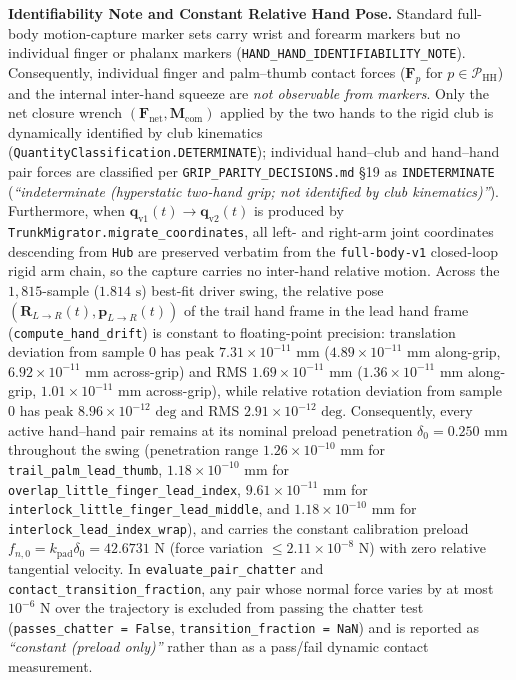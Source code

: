 \documentclass[11pt,a4paper]{article}
\begin{document}
\textbf{Identifiability Note and Constant Relative Hand Pose.} Standard full-body motion-capture marker sets carry wrist and forearm markers but no individual finger or phalanx markers (\texttt{HAND\_HAND\_IDENTIFIABILITY\_NOTE}). Consequently, individual finger and palm--thumb contact forces ($\mathbf{F}_p$ for $p \in \mathcal{P}_{\mathrm{HH}}$) and the internal inter-hand squeeze are \emph{not observable from markers}. Only the net closure wrench $(\mathbf{F}_{\mathrm{net}}, \mathbf{M}_{\mathrm{com}})$ applied by the two hands to the rigid club is dynamically identified by club kinematics (\texttt{QuantityClassification.DETERMINATE}); individual hand--club and hand--hand pair forces are classified per \texttt{GRIP\_PARITY\_DECISIONS.md} \S 19 as \texttt{INDETERMINATE} (\emph{``indeterminate (hyperstatic two-hand grip; not identified by club kinematics)''}). Furthermore, when $\mathbf{q}_{\mathrm{v1}}(t) \to \mathbf{q}_{\mathrm{v2}}(t)$ is produced by \texttt{TrunkMigrator.migrate\_coordinates}, all left- and right-arm joint coordinates descending from \texttt{Hub} are preserved verbatim from the \texttt{full-body-v1} closed-loop rigid arm chain, so the capture carries no inter-hand relative motion. Across the $1{,}815$-sample ($1.814\text{ s}$) best-fit driver swing, the relative pose $(\mathbf{R}_{L\to R}(t), \mathbf{p}_{L\to R}(t))$ of the trail hand frame in the lead hand frame (\texttt{compute\_hand\_drift}) is constant to floating-point precision: translation deviation from sample $0$ has peak $7.31 \times 10^{-11}\text{ mm}$ ($4.89 \times 10^{-11}\text{ mm}$ along-grip, $6.92 \times 10^{-11}\text{ mm}$ across-grip) and RMS $1.69 \times 10^{-11}\text{ mm}$ ($1.36 \times 10^{-11}\text{ mm}$ along-grip, $1.01 \times 10^{-11}\text{ mm}$ across-grip), while relative rotation deviation from sample $0$ has peak $8.96 \times 10^{-12}\text{ deg}$ and RMS $2.91 \times 10^{-12}\text{ deg}$. Consequently, every active hand--hand pair remains at its nominal preload penetration $\delta_0 = 0.250\text{ mm}$ throughout the swing (penetration range $1.26 \times 10^{-10}\text{ mm}$ for \texttt{trail\_palm\_lead\_thumb}, $1.18 \times 10^{-10}\text{ mm}$ for \texttt{overlap\_little\_finger\_lead\_index}, $9.61 \times 10^{-11}\text{ mm}$ for \texttt{interlock\_little\_finger\_lead\_middle}, and $1.18 \times 10^{-10}\text{ mm}$ for \texttt{interlock\_lead\_index\_wrap}), and carries the constant calibration preload $f_{n,0} = k_{\mathrm{pad}}\delta_0 = 42.6731\text{ N}$ (force variation $\le 2.11 \times 10^{-8}\text{ N}$) with zero relative tangential velocity. In \texttt{evaluate\_pair\_chatter} and \texttt{contact\_transition\_fraction}, any pair whose normal force varies by at most $10^{-6}\text{ N}$ over the trajectory is excluded from passing the chatter test (\texttt{passes\_chatter = False}, \texttt{transition\_fraction = NaN}) and is reported as \emph{``constant (preload only)''} rather than as a pass/fail dynamic contact measurement.
\end{document}
